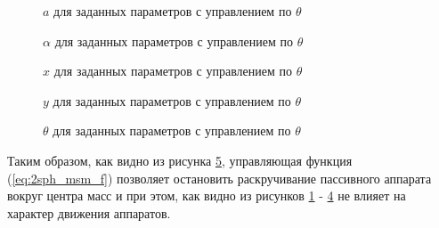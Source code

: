 \begin{figure}[H]
	\caption{$a$ для заданных параметров с управлением по $\theta$}
	\label{ris:2sph_msm_a_full_u}
\end{figure}
\begin{figure}[H]
	\caption{$\alpha$ для заданных параметров с управлением по $\theta$}
	\label{ris:2sph_msm_alpha_full_u}
\end{figure} 
\begin{figure}[H]
	\caption{$x$ для заданных параметров с управлением по $\theta$}
	\label{ris:2sph_msm_x_full_u}
\end{figure} 
\begin{figure}[H]
	\caption{$y$ для заданных параметров с управлением по $\theta$}
	\label{ris:2sph_msm_y_full_u}
\end{figure} 
\begin{figure}[H]
	\caption{$\theta$ для заданных параметров с управлением по $\theta$}
	\label{ris:2sph_msm_theta_full_u}
\end{figure}

Таким образом, как видно из рисунка \ref{ris:2sph_msm_theta_full_u}, управляющая функция (\ref{eq:2sph_msm_f}) позволяет остановить раскручивание пассивного аппарата вокруг центра масс и при этом, как видно из рисунков \ref{ris:2sph_msm_a_full_u} - \ref{ris:2sph_msm_y_full_u} не влияет на характер движения аппаратов.